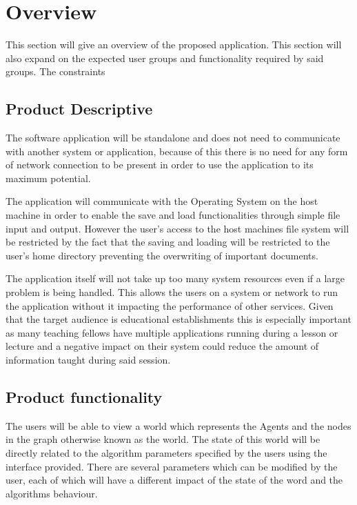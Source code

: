 \documentclass[10pt,a4paper]{article}
\begin{document}
\section{Overview}

This section will give an overview of the proposed application. This section will also expand on the expected user groups and functionality required by said groups. The constraints 

\subsection{Product Descriptive}

The software application will be standalone and does not need to communicate with another system or application, because of this there is no need for any form of network connection to be present in order to use the application to its maximum potential.

The application will communicate with the Operating System on the host machine in order to enable the save and load functionalities through simple file input and output. However the user’s access to the host machines file system will be restricted by the fact that the saving and loading will be restricted to the user’s home directory preventing the overwriting of important documents.

The application itself will not take up too many system resources even if a large problem is being handled. This allows the users on a system or network to run the application without it impacting the performance of other services. Given that the target audience is educational establishments this is especially important as many teaching fellows have multiple applications running during a lesson or lecture and a negative impact on their system could reduce the amount of information taught during said session.

\subsection{Product functionality}

The users will be able to view a world which represents the Agents and the nodes in the graph otherwise known as the world. The state of this world will be directly related to the algorithm parameters specified by the users using the interface provided. There are several parameters which can be modified by the user, each of which will have a different impact of the state of the word and the algorithms behaviour.
\end{document}
